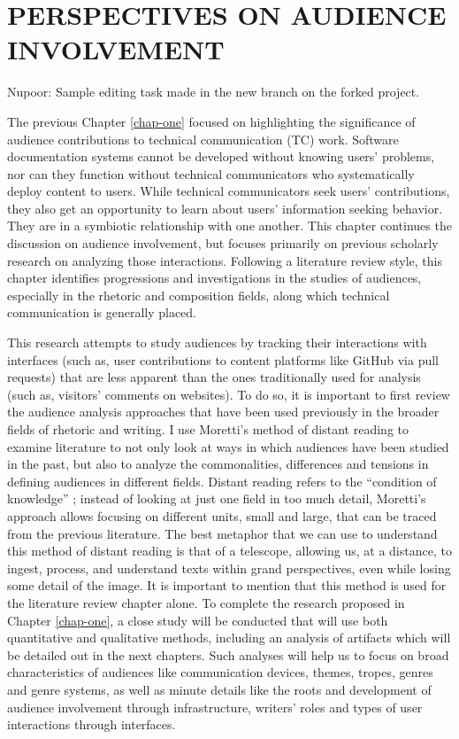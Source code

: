\chapter{PERSPECTIVES ON AUDIENCE INVOLVEMENT}
\label{chap-two}


Nupoor: Sample editing task made in the new branch on the forked project. 

The previous Chapter \ref{chap-one} focused on highlighting the significance of audience contributions to technical communication (TC) work. Software documentation systems cannot be developed without knowing users’ problems, nor can they function without technical communicators who systematically deploy content to users. While technical communicators seek users’ contributions, they also get an opportunity to learn about users’ information seeking behavior. They are in a symbiotic relationship with one another. This chapter continues the discussion on audience involvement, but focuses primarily on previous scholarly research on analyzing those interactions. Following a literature review style, this chapter identifies progressions and investigations in the studies of audiences, especially in the rhetoric and composition fields, along which technical communication is generally placed.

This research attempts to study audiences by tracking their interactions with interfaces (such as, user contributions to content platforms like GitHub via pull requests) that are less apparent than the ones traditionally used for analysis (such as, visitors’ comments on websites). To do so, it is important to first review the audience analysis approaches that have been used previously in the broader fields of rhetoric and writing. I use Moretti’s \cite{moretti2000conjectures} method of distant reading to examine literature to not only look at ways in which audiences have been studied in the past, but also to analyze the commonalities, differences and tensions in defining audiences in different fields. Distant reading refers to the “condition of knowledge” \cite{moretti2000conjectures}; instead of looking at just one field in too much detail, Moretti’s approach allows focusing on different units, small and large, that can be traced from the previous literature. The  best  metaphor  that  we  can  use  to understand this method of distant reading is that of a telescope, allowing us, at a distance, to ingest, process, and understand texts within grand perspectives, even while losing some detail of the image. It is important to mention that this method is used for the literature review chapter alone. To complete the research proposed in Chapter \ref{chap-one}, a close study will be conducted that will use both quantitative and qualitative methods, including an analysis of artifacts which will be detailed out in the next chapters. Such analyses will help us to focus on broad characteristics of audiences like communication devices, themes, tropes, genres and genre systems, as well as minute details like the roots and development of audience involvement through infrastructure, writers’ roles and types of user interactions through interfaces.

